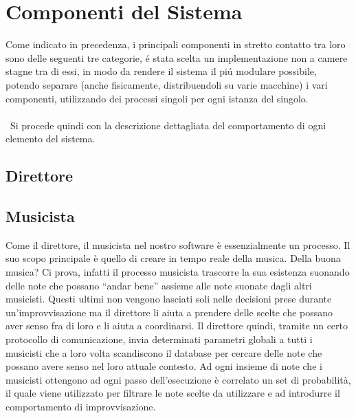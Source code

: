 \section{Componenti del Sistema}
Come indicato in precedenza, i principali componenti in stretto contatto
tra loro sono delle seguenti tre categorie, \'e stata scelta un implementazione
non a camere stagne tra di essi, in modo da rendere il sistema il pi\'u modulare
possibile, potendo separare (anche fisicamente, distribuendoli su varie macchine)
i vari componenti, utilizzando dei processi singoli per ogni istanza del singolo.\\\
\\\
Si procede quindi con la descrizione dettagliata del comportamento di ogni
elemento del sistema.

\subsection{Direttore}

\subsection{Musicista}
Come il direttore, il musicista nel nostro software è essenzialmente un processo. Il suo scopo principale è quello di creare in tempo reale della musica. Della buona musica? Ci prova, infatti il processo musicista trascorre la sua esistenza suonando delle note che possano ``andar bene'' assieme alle note suonate dagli altri musicisti. Questi ultimi non vengono lasciati soli nelle decisioni prese durante un'improvvisazione ma il direttore li aiuta a prendere delle scelte che possano aver senso fra di loro e li aiuta a coordinarsi. Il direttore quindi, tramite un certo protocollo di comunicazione, invia determinati parametri globali a tutti i musicisti che a loro volta scandiscono il database per cercare delle note che possano avere senso nel loro attuale contesto. Ad ogni insieme di note che i musicisti ottengono ad ogni passo dell'esecuzione è correlato un set di probabilità, il quale viene utilizzato per filtrare le note scelte da utilizzare e ad introdurre il comportamento di improvvisazione.


